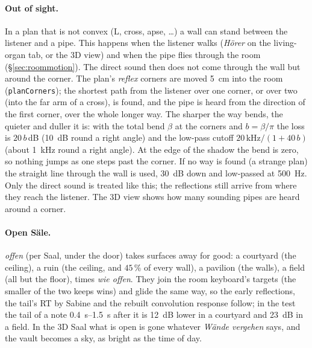 \documentclass[11pt,a4paper,parskip=half,DIV=11,toc=bibliography]{scrartcl}
\newcommand{\ui}[1]{\emph{#1}}                 %
\newcommand{\fn}[1]{\mbox{\texttt{#1}}}
\begin{document}
\paragraph{Out of sight.} In a plan that is not convex (L, cross, apse, \dots) a wall can stand between the listener and a
pipe. This happens when the listener walks (\ui{Hörer} on the living-organ tab, or the 3D view) and when the pipe
flies through the room (\S\ref{sec:roommotion}). The direct sound then does not come through the wall but around the
corner. The plan's \emph{reflex} corners are moved \SI{5}{cm} into the room (\fn{planCorners}); the shortest path
from the listener over one corner, or over two (into the far arm of a cross), is found, and the pipe is heard from the direction
of the first corner, over the whole longer way. The sharper the way bends, the quieter and duller it is: with the
total bend $\beta$ at the corners and $b = \beta/\pi$ the loss is $20\,b$\,dB (\SI{10}{dB} round a right angle) and the
low-pass cutoff $20\,\mathrm{kHz}/(1+40\,b)$ (about \SI{1}{kHz} round a right angle). At the edge of the shadow the bend is zero,
so nothing jumps as one steps past the corner. If no way is found (a strange plan) the straight line through the wall is
used, \SI{30}{dB} down and low-passed at \SI{500}{Hz}. Only the direct sound is treated like this; the reflections still
arrive from where they reach the listener. The 3D view shows how many sounding pipes are heard around a corner.

\paragraph{Open Säle.} \ui{offen} (per Saal, under the door) takes surfaces away for good: a courtyard (the ceiling), a ruin (the ceiling,
and $45\,\%$ of every wall), a pavilion (the walls), a field (all but the floor), times \ui{wie offen}. They join the room keyboard's targets
(the smaller of the two keeps wins) and glide the same way, so the early reflections, the tail's RT by Sabine and the rebuilt convolution
response follow; in the test the tail of a note \SIrange{0.4}{1.5}{s} after it is \SI{12}{dB} lower in a courtyard and \SI{23}{dB} in a field.
In the 3D Saal what is open is gone whatever \ui{Wände vergehen} says, and the vault becomes a sky, as bright as the time of day.
\end{document}
